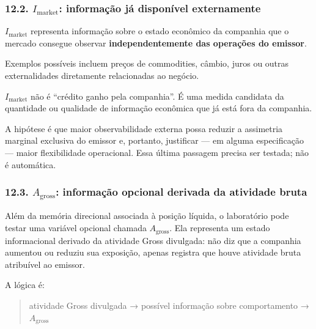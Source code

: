 \documentclass[
  a4paper,
]{article}
\begin{document}
\hypertarget{122-i_mathrmmarket-informauxe7uxe3o-juxe1-disponuxedvel-externamente}{%
\subsubsection{\texorpdfstring{12.2. \(I_{\mathrm{market}}\): informação
já disponível
externamente}{12.2. I\_\{\textbackslash mathrm\{market\}\}: informação já disponível externamente}}\label{122-i_mathrmmarket-informauxe7uxe3o-juxe1-disponuxedvel-externamente}}

\(I_{\mathrm{market}}\) representa informação sobre o estado econômico
da companhia que o mercado consegue observar \textbf{independentemente
das operações do emissor}.

Exemplos possíveis incluem preços de commodities, câmbio, juros ou
outras externalidades diretamente relacionadas ao negócio.

\(I_{\mathrm{market}}\) não é ``crédito ganho pela companhia''. É uma
medida candidata da quantidade ou qualidade de informação econômica que
já está fora da companhia.

A hipótese é que maior observabilidade externa possa reduzir a
assimetria marginal exclusiva do emissor e, portanto, justificar --- em
alguma especificação --- maior flexibilidade operacional. Essa última
passagem precisa ser testada; não é automática.

\hypertarget{12-3-a-gross-informacao-opcional-derivada-da-atividade-bruta}{}

\hypertarget{123-a_mathrmgross-informauxe7uxe3o-opcional-derivada-da-atividade-bruta}{%
\subsubsection{\texorpdfstring{12.3. \(A_{\mathrm{gross}}\): informação
opcional derivada da atividade
bruta}{12.3. A\_\{\textbackslash mathrm\{gross\}\}: informação opcional derivada da atividade bruta}}\label{123-a_mathrmgross-informauxe7uxe3o-opcional-derivada-da-atividade-bruta}}

Além da memória direcional associada à posição líquida, o laboratório
pode testar uma variável opcional chamada
\textbf{\(A_{\mathrm{gross}}\)}. Ela representa um estado informacional
derivado da atividade Gross divulgada: não diz que a companhia aumentou
ou reduziu sua exposição, apenas registra que houve atividade bruta
atribuível ao emissor.

A lógica é:

\begin{quote}
atividade Gross divulgada → possível informação sobre comportamento →
\(A_{\mathrm{gross}}\)
\end{quote}
\end{document}
